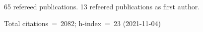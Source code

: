 65 refereed publications. 13 refeered publications as first author.

Total citations~=~2082; h-index~=~23 (2021-11-04)